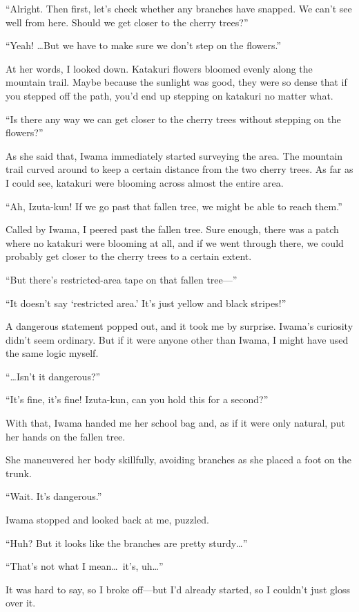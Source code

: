 \documentclass[
    a4paper,
    12pt,
    twoside,
    openany,
    UTF8,
    fontset=windows
]{ctexbook}
\begin{document}
``Alright. Then first, let's check whether any branches have snapped. We can't see well from here. Should we get closer to the cherry trees?''

``Yeah! \dots But we have to make sure we don't step on the flowers.''

At her words, I looked down. Katakuri flowers bloomed evenly along the mountain trail. Maybe because the sunlight was good, they were so dense that if you stepped off the path, you'd end up stepping on katakuri no matter what.

``Is there any way we can get closer to the cherry trees without stepping on the flowers?''

As she said that, Iwama immediately started surveying the area. The mountain trail curved around to keep a certain distance from the two cherry trees. As far as I could see, katakuri were blooming across almost the entire area.

``Ah, Izuta-kun! If we go past that fallen tree, we might be able to reach them.''

Called by Iwama, I peered past the fallen tree. Sure enough, there was a patch where no katakuri were blooming at all, and if we went through there, we could probably get closer to the cherry trees to a certain extent.

``But there's restricted-area tape on that fallen tree---''

``It doesn't say `restricted area.' It's just yellow and black stripes!''

A dangerous statement popped out, and it took me by surprise. Iwama's curiosity didn't seem ordinary. But if it were anyone other than Iwama, I might have used the same logic myself.

``\dots Isn't it dangerous?''

``It's fine, it's fine! Izuta-kun, can you hold this for a second?''

With that, Iwama handed me her school bag and, as if it were only natural, put her hands on the fallen tree.

She maneuvered her body skillfully, avoiding branches as she placed a foot on the trunk.

``Wait. It's dangerous.''

Iwama stopped and looked back at me, puzzled.

``Huh? But it looks like the branches are pretty sturdy\dots''

``That's not what I mean\dots\ it's, uh\dots''

It was hard to say, so I broke off---but I'd already started, so I couldn't just gloss over it.
\end{document}
